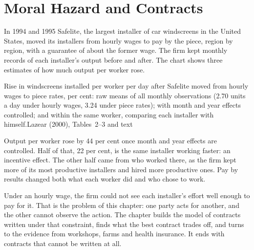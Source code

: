 \chapter{Moral Hazard and Contracts}\label{ch:b2:moral-hazard}

In 1994 and 1995 Safelite, the largest installer of car windscreens in the United States, moved its installers from
hourly wages to pay by the piece, region by region, with a guarantee of about the former wage. The firm kept monthly
records of each installer's output before and after. The chart shows three estimates of how much output per worker
rose.

\begin{openingchart}{Rise in windscreens installed per worker per day after Safelite moved from hourly wages to piece
  rates, per cent: raw means of all monthly observations (2.70 units a day under hourly wages, 3.24 under piece rates);
  with month and year effects controlled; and within the same worker, comparing each installer with himself.}{Lazear
  (2000), Tables~2--3 and text}
\end{openingchart}

Output per worker rose by 44 per cent once month and year effects are controlled. Half of that, 22 per cent, is the same
installer working faster: an incentive effect. The other half came from who worked there, as the firm kept more of its
most productive installers and hired more productive ones. Pay by results changed both what each worker did and who
chose to work.

Under an hourly wage, the firm could not see each installer's effort well enough to pay for it. That is the problem of
this chapter: one party acts for another, and the other cannot observe the action. The chapter builds the model of
contracts written under that constraint, finds what the best contract trades off, and turns to the evidence from
workshops, farms and health insurance. It ends with contracts that cannot be written at all.

